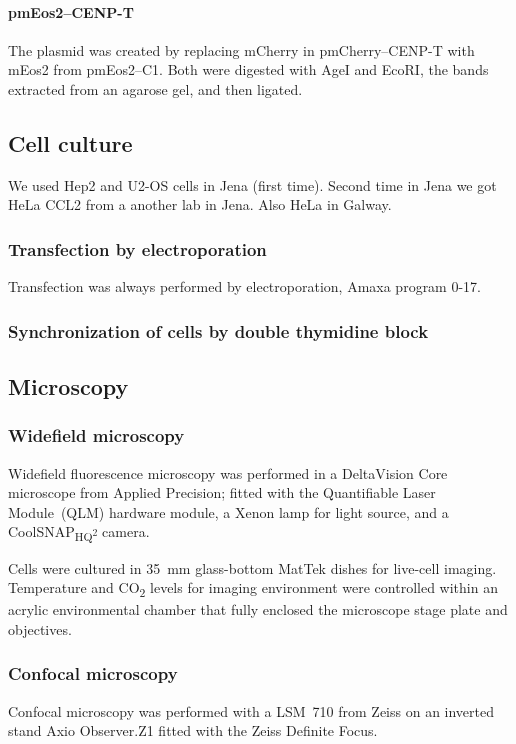     \paragraph{pmEos2--CENP-T}
      The plasmid was created by replacing mCherry in pmCherry--CENP-T
      with mEos2 from pmEos2--C1.  Both were digested with AgeI and EcoRI,
      the bands extracted from an agarose gel, and then ligated.


  \subsection{Cell culture}

    We used Hep2 and U2-OS cells in Jena (first time).  Second time in Jena
    we got HeLa CCL2 from a another lab in Jena.  Also HeLa in Galway.

    \subsubsection{Transfection by electroporation}
      Transfection was always performed by electroporation, Amaxa program 0-17.


    \subsubsection{Synchronization of cells by double thymidine block}


  \subsection{Microscopy}

    \subsubsection{Widefield microscopy}
      Widefield fluorescence microscopy was performed in a DeltaVision Core
      microscope from Applied Precision; fitted with the Quantifiable Laser
      Module~(QLM) hardware module, a Xenon lamp for light source,
      and a CoolSNAP\textsubscript{HQ\textsuperscript{2}} camera.

      Cells were cultured in \SI{35}{\mm} glass-bottom MatTek dishes
      for live-cell imaging.  Temperature and CO\textsubscript{2} levels
      for imaging environment were controlled within an acrylic
      environmental chamber that fully enclosed the microscope stage
      plate and objectives.

    \subsubsection{Confocal microscopy}
      Confocal microscopy was performed with a LSM~710 from Zeiss on
      an inverted stand Axio Observer.Z1 fitted with the Zeiss Definite Focus.

